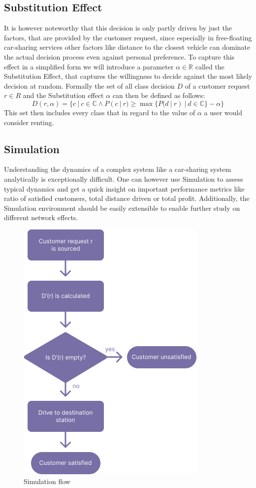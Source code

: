 \subsection{Substitution Effect}
\label{sub_sec:Method/Substitution}

It is however noteworthy that this decision is only
partly driven by just the factors, that are provided by the customer request, since especially in free-floating car-sharing services
other factors like distance to the closest vehicle can dominate the actual decision process even against personal
preference. To capture this effect in a simplified form we will introduce a parameter $\alpha \in \mathbb{R}$
called the Substitution Effect, that captures the willingness to decide against the most likely
decision at random. Formally the set of all class decision $D$ of a customer request $r \in R$ and the 
Substitution effect $\alpha$ can then be defined as follows:
$$
  D(r, \alpha) = \{ c \ | \ c \in \mathbb{C} \land P(c \ | \ r) \ge \max\{ P(d \ | \ r) \ | \ d \in \mathbb{C} \} - \alpha \}
$$
This set then includes every class that in regard to the value of $\alpha$ a user would consider renting.

\subsection{Simulation}
\label{sub_sec:Method/Simulation}

Understanding the dynamics of a complex system like a car-sharing system analytically is exceptionally difficult.
One can however use Simulation to assess typical dynamics and get a quick insight on important performance metrics
like ratio of satisfied customers, total distance driven or total profit. Additionally, the Simulation
environment should be easily extensible to enable further study on different network effects. 

\begin{figure}[htbp]
  \centering
  \includegraphics[width=.5\linewidth]{./Figures/event-flow.png}
  \caption{Simulation flow}
  \label{fig:Flow}
\end{figure}

